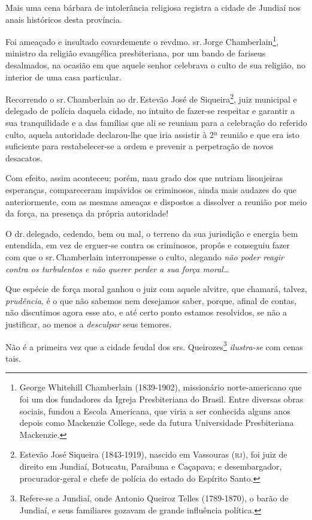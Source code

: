 Mais uma cena bárbara de intolerância religiosa registra a cidade de
Jundiaí nos anais históricos desta província.

Foi ameaçado e insultado covardemente o revdmo. sr.\,Jorge
Chamberlain\footnote{George Whitehill Chamberlain (1839-1902),
  missionário norte-americano que foi um dos fundadores da Igreja
  Presbiteriana do Brasil. Entre diversas obras sociais, fundou a Escola
  Americana, que viria a ser conhecida alguns anos depois como Mackenzie
  College, sede da futura Universidade Presbiteriana Mackenzie.},
ministro da religião evangélica presbiteriana, por um bando de fariseus
desalmados, na ocasião em que aquele senhor celebrava o culto de sua
religião, no interior de uma casa particular.

Recorrendo o sr.\,Chamberlain ao dr.\,Estevão José de Siqueira\footnote{
  Estevão José Siqueira (1843-1919), nascido em Vassouras (\textsc{rj}), foi juiz
  de direito em Jundiaí, Botucatu, Paraibuna e Caçapava; e
  desembargador, procurador-geral e chefe de polícia do estado do
  Espírito Santo.}, juiz municipal e delegado de polícia daquela cidade,
no intuito de fazer-se respeitar e garantir a sua tranquilidade e a das
famílias que ali se reuniam para a celebração do referido culto, aquela
autoridade declarou-lhe que iria assistir à 2ª reunião e que era isto
suficiente para restabelecer-se a ordem e prevenir a perpetração de
novos desacatos.

Com efeito, assim aconteceu; porém, mau grado dos que nutriam
lisonjeiras esperanças, compareceram impávidos os criminosos, ainda mais
audazes do que anteriormente, com as mesmas ameaças e dispostos a
dissolver a reunião por meio da força, na presença da própria
autoridade!

O dr.\,delegado, cedendo, bem ou mal, o terreno da sua jurisdição e
energia bem entendida, em vez de erguer-se contra os criminosos, propôs
e conseguiu fazer com que o sr.\,Chamberlain interrompesse o culto,
alegando \emph{não poder reagir contra os turbulentos e não querer
perder a sua força moral\ldots{}}

Que espécie de força moral ganhou o juiz com aquele alvitre, que
chamará, talvez, \emph{prudência}, é o que não sabemos nem desejamos
saber, porque, afinal de contas, não discutimos agora esse ato, e até
certo ponto estamos resolvidos, se não a justificar, ao menos a
\emph{desculpar} seus temores.

Não é a primeira vez que a cidade feudal dos srs. Queirozes\footnote{
  Refere-se a Jundiaí, onde Antonio Queiroz Telles (1789-1870), o barão
  de Jundiaí, e seus familiares gozavam de grande influência política.}
\emph{ilustra-se} com cenas tais.

